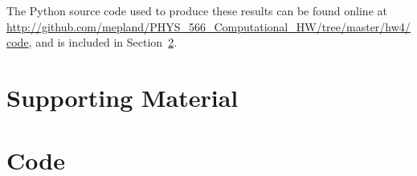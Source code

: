 \documentclass[notitlepage,aps,prd,nofootinbib]{revtex4-1}
\begin{document}
The Python source code used to produce these results can be found online at \url{http://github.com/mepland/PHYS_566_Computational_HW/tree/master/hw4/code}, and is included in Section~\ref{sec:code}.

\clearpage
\section{Supporting Material}
\label{sec:Supporting_Material}



\clearpage


\clearpage
\section{Code}
\label{sec:code}


\end{document}
